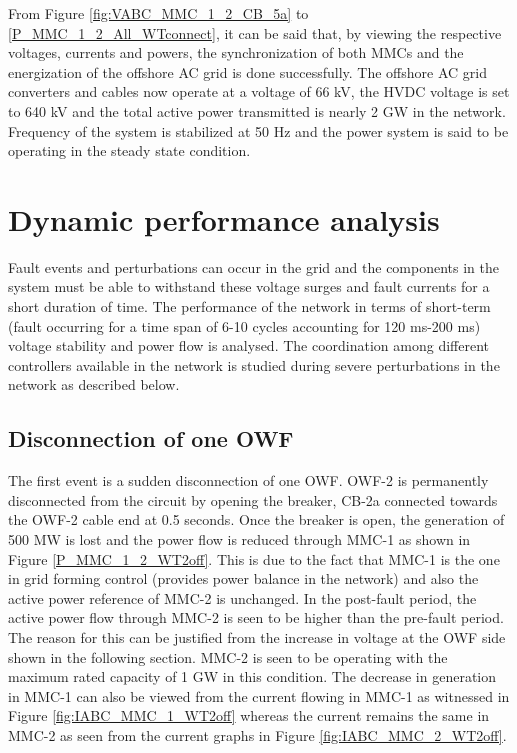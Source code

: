 From Figure \ref{fig:VABC_MMC_1_2_CB_5a} to \ref{P_MMC_1_2_All_WTconnect}, it can be said that, by viewing the respective voltages, currents and powers, the synchronization of both \gls{MMC}s and the energization of the offshore \gls{AC} grid is done successfully. The offshore \gls{AC} grid converters and cables now operate at a voltage of 66 kV, the \gls{HVDC} voltage is set to 640 kV and the total active power transmitted is nearly 2 GW in the network. Frequency of the system is stabilized at 50 Hz and the power system is said to be operating in the steady state condition.  

\section{Dynamic performance analysis}
Fault events and perturbations can occur in the grid and the components in the system must be able to withstand these voltage surges and fault currents for a short duration of time. The performance of the network in terms of short-term (fault occurring for a time span of 6-10 cycles accounting for 120 ms-200 ms) voltage stability and power flow is analysed. The coordination among different controllers available in the network is studied during severe perturbations in the network as described below.  

\subsection{Disconnection of one OWF}\label{disconnection_one_OWF}
The first event is a sudden disconnection of one \gls{OWF}. \gls{OWF}-2 is permanently disconnected from the circuit by opening the breaker, CB-2a connected towards the \gls{OWF}-2 cable end at 0.5 seconds. Once the breaker is open, the generation of 500 MW is lost and the power flow is reduced through \gls{MMC}-1 as shown in Figure \ref{P_MMC_1_2_WT2off}. This is due to the fact that \gls{MMC}-1 is the one in grid forming control (provides power balance in the network) and also the active power reference of \gls{MMC}-2 is unchanged. In the post-fault period, the active power flow through \gls{MMC}-2 is seen to be higher than the pre-fault period. The reason for this can be justified from the increase in voltage at the \gls{OWF} side shown in the following section. \gls{MMC}-2 is seen to be operating with the maximum rated capacity of 1 GW in this condition. The decrease in generation in \gls{MMC}-1 can also be viewed from the current flowing in \gls{MMC}-1 as witnessed in Figure \ref{fig:IABC_MMC_1_WT2off} whereas the current remains the same in \gls{MMC}-2 as seen from the current graphs in Figure \ref{fig:IABC_MMC_2_WT2off}.  



